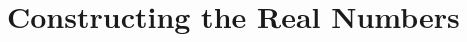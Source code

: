 \section{Constructing the Real Numbers}
\label{real}

\addtocounter{theorem}{3}
\begin{lemma} %
	\label{real:l:mult_req}
	\TBD
\end{lemma}

\addtocounter{theorem}{1}
\begin{theorem} %
	\label{real:t:props}
	\TBD
\end{theorem}


\addtocounter{exercise}{2}
\Newpage
\begin{exercise} %
	\label{real:e:3}
	\TBD
\end{exercise}